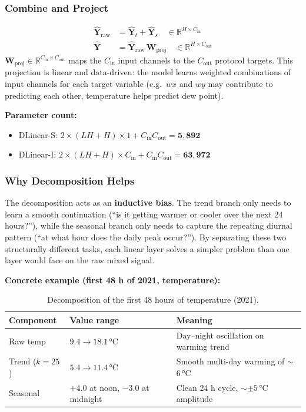 \subsubsection{Combine and Project}
%
\begin{align}
\mathbf{\hat{Y}}_{\text{raw}} &= \mathbf{\hat{Y}}_t + \mathbf{\hat{Y}}_s
        \quad \in \mathbb{R}^{H \times C_{\text{in}}} \\
\mathbf{\hat{Y}} &= \mathbf{\hat{Y}}_{\text{raw}} \, \mathbf{W}_{\text{proj}}
        \quad \in \mathbb{R}^{H \times C_{\text{out}}}
\end{align}
%
$\mathbf{W}_{\text{proj}} \in \mathbb{R}^{C_{\text{in}} \times C_{\text{out}}}$
maps the $C_{\text{in}}$ input channels to the $C_{\text{out}}$ protocol targets.
This projection is linear and data-driven: the model learns weighted combinations
of input channels for each target variable (e.g.\ $wx$ and $wy$ may contribute to
predicting each other, temperature helps predict dew point).

\textbf{Parameter count:}
\begin{itemize}
  \item DLinear-S: $2 \times (LH + H) \times 1 + C_{\text{in}} C_{\text{out}}
        = \mathbf{5{,}892}$
  \item DLinear-I: $2 \times (LH + H) \times C_{\text{in}} + C_{\text{in}}
        C_{\text{out}} = \mathbf{63{,}972}$
\end{itemize}

\subsubsection{Why Decomposition Helps}

The decomposition acts as an \textbf{inductive bias}. The trend branch only needs
to learn a smooth continuation (``is it getting warmer or cooler over the next 24
hours?''), while the seasonal branch only needs to capture the repeating diurnal
pattern (``at what hour does the daily peak occur?''). By separating these two
structurally different tasks, each linear layer solves a simpler problem than one
layer would face on the raw mixed signal.

\textbf{Concrete example (first 48 h of 2021, temperature):}
\begin{table}[H]
\centering
\caption{Decomposition of the first 48 hours of temperature (2021).}
\begin{tabular}{lll}
\toprule
Component & Value range & Meaning \\
\midrule
Raw temp  & $9.4 \to 18.1$\,°C & Day--night oscillation on warming trend \\
Trend ($k=25$) & $5.4 \to 11.4$\,°C & Smooth multi-day warming of $\sim$6\,°C \\
Seasonal & $+4.0$ at noon, $-3.0$ at midnight & Clean 24 h cycle, $\sim\pm 5$\,°C amplitude \\
\bottomrule
\end{tabular}
\end{table}

